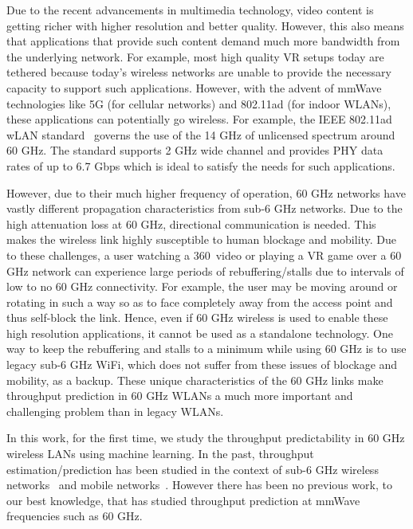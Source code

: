 \documentclass[sigconf,anonymous]{acmart}
\begin{document}
Due to the recent advancements in multimedia technology, video content
is getting richer with higher resolution and better quality. However,
this also means that applications that provide such content demand
much more bandwidth from the underlying network. For example, most
high quality VR setups today are tethered because today's wireless
networks are unable to provide the necessary capacity to support such
applications. However, with the advent of mmWave technologies like 5G
(for cellular networks) and 802.11ad (for indoor WLANs), these
applications can potentially go wireless. For example, the IEEE 802.11ad
wLAN standard~\cite{80211ad} governs the use of the 14 GHz of
unlicensed spectrum around 60 GHz. The standard supports 2 GHz wide
channel and provides PHY data rates of up to 6.7 Gbps which is ideal
to satisfy the needs for such applications.

However, due to their much higher frequency of operation, 60 GHz networks have vastly different propagation characteristics from sub-6 GHz networks. Due to the high attenuation loss at 60 GHz, directional communication is needed. This makes the wireless link highly susceptible to human blockage and mobility. Due to these challenges, a user watching a 360\degree~video or playing a VR game over a 60 GHz network can experience large periods of rebuffering/stalls due to intervals of low to no 60 GHz connectivity. For example, the user may be moving around or rotating in such a way so as to face completely away from the access point and thus self-block the link. Hence, even if 60 GHz wireless is used to enable these high resolution applications, it cannot be used as a standalone technology. One way to keep the rebuffering and stalls to a minimum while using 60 GHz is to use legacy sub-6 GHz WiFi, which does not suffer from these issues of blockage and mobility, as a backup.
These unique characteristics of the 60 GHz links make throughput prediction in 60 GHz WLANs a much more important and challenging problem than in legacy WLANs.

In this work, {for the first time}, we study the throughput predictability in 60 GHz wireless LANs using machine learning. In the past, throughput estimation/prediction has been studied in the context of sub-6 GHz wireless networks~\cite{khan:infocom2016,song:secon2017,kajita:wmnc2015} and mobile networks~\cite{liu:globecom2015}. However there has been no previous work, to our best knowledge, that has studied throughput prediction at mmWave frequencies such as 60 GHz. 
\end{document}
